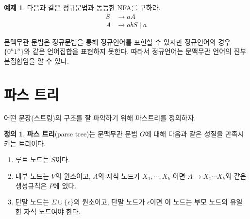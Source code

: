 \documentclass[b5paper]{book}
\theoremstyle{definition}
\newtheorem{defn}{정의}[chapter]
\newtheorem{ex}{예제}[chapter]
\begin{document}
\begin{ex}
   다음과 같은 정규문법과 동등한 NFA를 구하라.
   \begin{align*}
       S & \rightarrow aA \\ 
       A & \rightarrow abS \; \vert \; a 
   \end{align*} 
\end{ex}
\begin{figure}[!ht]
    \centering
    \caption{} 
    \label{regular grammar}
\end{figure}
문맥무관 문법은 정규문법을 통해 정규언어를 표현할 수 있지만 
정규언어의 경우 $\{0^n1^n\}$와 같은 언어집합을 표현하지 못한다. 
따라서 정규언어는 문맥무관 언어의 진부분집합임을 알 수 있다. 
\section{파스 트리}
어떤 문장(스트링)의 구조를 잘 파악하기 위해 파스트리를 정의하자.
\begin{defn}
    \textbf{파스 트리}(parse tree)는 문맥무관 문법 $G$에 대해 다음과 같은 성질을
    만족시키는 트리이다.
    \begin{enumerate}
        \item 루트 노드는 $S$이다.
        \item 내부 노드는 $V$의 원소이고, $A$의 자식 노드가 
        $X_1, \cdots, X_k $ 이면
        $A \rightarrow X_1 \cdots X_k$와 같은 생성규칙은 $P$에 있다. 
        \item 단말 노드는 $\Sigma \cup \{\epsilon\}$의 원소이고, 단말 노드가 $\epsilon$이면
        이 노드는 부모 노드의 유일한 자식 노드여야 한다. 
    \end{enumerate}
\end{defn}
\end{document}
